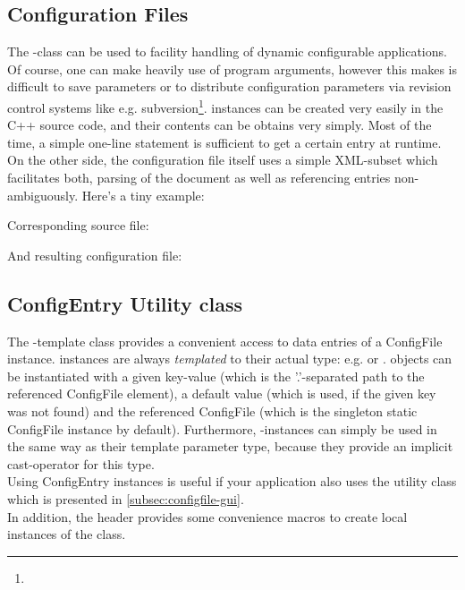 \subsection{Configuration Files\label{subsec:config-file}}
The -class can be used to facility handling of dynamic configurable applications. Of course, one can make heavily use of program arguments, however this makes is difficult to save parameters or to distribute configuration parameters via revision control systems like e.g. subversion\footnote{}.  instances can be created very easily in the C++ source code, and their contents can be obtains very simply. Most of the time, a simple one-line statement is sufficient to get a certain entry at runtime. On the other side, the configuration file itself uses a simple XML-subset which facilitates both, parsing of the document as well as referencing entries non-ambiguously. Here's a tiny example:


Corresponding source file:


And resulting configuration file:


\subsection{ConfigEntry Utility class}
The -template class  provides a convenient access to data entries of a ConfigFile instance.  instances are always \emph{templated} to their actual type: e.g.  or .  objects can be instantiated with a given key-value (which is the '.'-separated path to the referenced ConfigFile element), a default value (which is used, if the given key was not found) and the referenced ConfigFile (which is the singleton static ConfigFile instance by default). Furthermore, -instances can simply be used in the same way as their template parameter type, because they provide an implicit cast-operator for this type.\\
Using ConfigEntry instances is useful if your application also uses the  utility class  which is presented in \ref{subsec:configfile-gui}.\\
In addition, the header  provides some convenience macros to create local instances of the  class.

